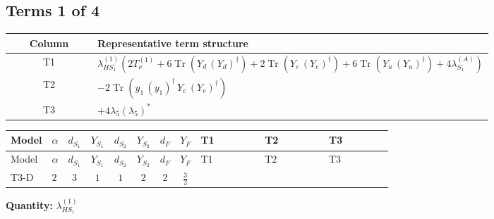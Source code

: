 \documentclass[8pt]{article}
\begin{document}
\begin{landscape}
\subsection*{Terms 1 of 4}
\begin{center}
\begin{tabular}{@{}c >{\raggedright\arraybackslash}p{0.82\linewidth}@{}}
\toprule
Column & Representative term structure \\
\midrule
T1 & \(\displaystyle {\lambda_{HS_1}^{(1)}} (2 T_{\nu}^{(1)}+6 \operatorname{Tr}\!\left({Y_d}\,\left({Y_d}\right)^{\dagger}\right)+2 \operatorname{Tr}\!\left({Y_e}\,\left({Y_e}\right)^{\dagger}\right)+6 \operatorname{Tr}\!\left({Y_u}\,\left({Y_u}\right)^{\dagger}\right)+4 {\lambda_{S_1}^{(A)}})\) \\
\midrule
T2 & \(\displaystyle -2 \operatorname{Tr}\!\left({y_1}\,\left({y_1}\right)^{\dagger}\,{Y_e}\,\left({Y_e}\right)^{\dagger}\right)\) \\
\midrule
T3 & \(\displaystyle +4 {\lambda_5} \left({\lambda_5}\right)^{*}\) \\
\midrule
\bottomrule
\end{tabular}
\end{center}
\smallskip
\tiny
\begin{longtable}{@{}llcccccc >{\raggedright\arraybackslash}p{0.21\linewidth} >{\raggedright\arraybackslash}p{0.21\linewidth} >{\raggedright\arraybackslash}p{0.21\linewidth}@{}}
\toprule
Model & $\alpha$ & $d_{S_1}$ & $Y_{S_1}$ & $d_{S_2}$ & $Y_{S_2}$ & $d_F$ & $Y_F$ & T1 & T2 & T3 \\
\midrule
\endfirsthead
\toprule
Model & $\alpha$ & $d_{S_1}$ & $Y_{S_1}$ & $d_{S_2}$ & $Y_{S_2}$ & $d_F$ & $Y_F$ & T1 & T2 & T3 \\
\midrule
\endhead
T3-D & $2$ & $3$ & $1$ & $1$ & $2$ & $2$ & $\frac{3}{2}$ & \scriptsize\adjustbox{max width=\linewidth}{$\begin{gathered} {\lambda_{HS_1}^{(1)}} (2 T_{\nu}^{(1)}+6 \operatorname{Tr}\!\left({Y_d}\,\left({Y_d}\right)^{\dagger}\right)+2 \operatorname{Tr}\!\left({Y_e}\,\left({Y_e}\right)^{\dagger}\right)+6 \operatorname{Tr}\!\left({Y_u}\,\left({Y_u}\right)^{\dagger}\right)+4 {\lambda_{S_1}^{(A)}})\end{gathered}$} & \scriptsize\adjustbox{max width=\linewidth}{$\begin{gathered} -2 \operatorname{Tr}\!\left({y_1}\,\left({y_1}\right)^{\dagger}\,{Y_e}\,\left({Y_e}\right)^{\dagger}\right)\end{gathered}$} & \scriptsize\adjustbox{max width=\linewidth}{$\begin{gathered} +4 {\lambda_5} \left({\lambda_5}\right)^{*}\end{gathered}$} \\
\midrule
\bottomrule
\end{longtable}
\clearpage
\noindent\textbf{Quantity: }$\lambda_{HS_1}^{(1)}$\par\smallskip

\end{landscape}
\end{document}
